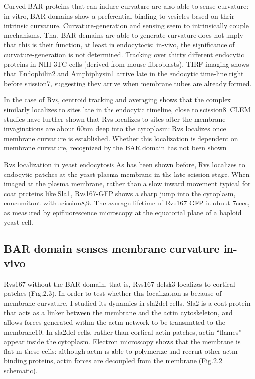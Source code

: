 \vspace{5mm}
Curved BAR proteins that can induce curvature are also able to sense curvature: in-vitro, BAR domains show a preferential-binding to vesicles based on their intrinsic curvature. Curvature-generation and sensing seem to intrinsically couple mechanisms. That BAR domains are able to generate curvature does not imply that this is their function, at least in endocytocis: in-vivo, the significance of curvature-generation is not determined. Tracking over thirty different endocytic proteins in NIH-3TC cells (derived from mouse fibroblasts), TIRF imaging shows that Endophilin2 and Amphiphysin1 arrive late in the endocytic time-line right before scission7, suggesting they arrive when membrane tubes are already formed. 

\vspace{5mm}
In the case of Rvs, centroid tracking and averaging shows that the complex similarly localizes to sites late in the endocytic timeline, close to scission8. CLEM studies have further shown that Rvs localizes to sites after the membrane invaginations are about 60nm deep into the cytoplasm: Rvs localizes once membrane curvature is established. Whether this localization is dependent on membrane curvature, recognized by the BAR domain has not been shown. 

\vspace{5mm}
Rvs localization in yeast endocytosis
As has been shown before, Rvs localizes to endocytic patches at the yeast plasma membrane in the late scission-stage. When imaged at the plasma membrane, rather than a slow inward movement typical for coat proteins like Sla1, Rvs167-GFP shows a sharp jump into the cytoplasm, concomitant with scission8,9. The average lifetime of Rvs167-GFP is about 7secs, as measured by epifluorescence microscopy at the equatorial plane of a haploid yeast cell. 


	\subsection{BAR domain senses membrane curvature in-vivo}
	Rvs167 without the BAR domain, that is, Rvs167-delsh3 localizes to cortical patches (Fig.2.3). In order to test whether this localization is because of membrane curvature, I studied its dynamics in sla2del cells. Sla2 is a coat protein that acts as a linker between the membrane and the actin cytoskeleton, and allows forces generated within the actin network to be transmitted to the membrane10. In sla2del cells, rather than cortical actin patches, actin “flames” appear inside the cytoplasm. Electron microscopy shows that the membrane is flat in these cells: although actin is able to polymerize and recruit other actin-binding proteins, actin forces are decoupled from the membrane (Fig.2.2 schematic). 
	
